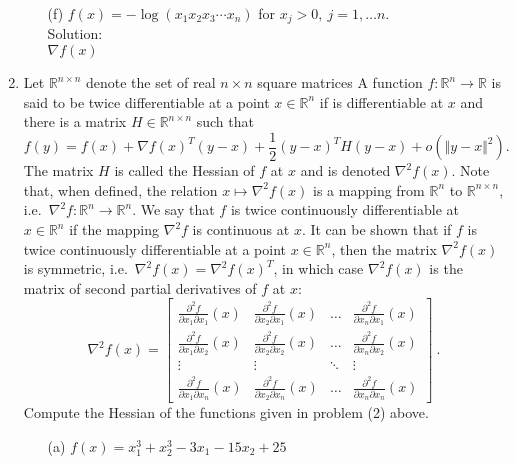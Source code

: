 \documentclass[12pt]{amsart}
\newcommand{\norm}[1]{\Vert #1 \Vert}
\newcommand{\Rn}{\R^n}
\newcommand{\R}{{\mathbb{R}}}
\newcommand{\grad}{\nabla}
\newcommand{\Rnn}{\R^{n\times n}}
\newcommand{\map}[3]{#1:#2\rightarrow #3}
\newcommand{\half}{\frac{1}{2}}
\begin{document}
\begin{enumerate}
\begin{enumerate}
\item[(f)] $f(x)=-\log(x_1x_2x_3\cdots x_n)$ for $x_j>0,\ j=1,\dots n$.\\

\noindent
Solution:\\
$\grad f(x) $\\

\end{enumerate}




\item
Let $\Rnn$ denote the set of real $n\times n$ square matrices
A function $\map{f}{\Rn}{\R}$ is said to be twice differentiable at a point $x\in\Rn$
if is differentiable at $x$ and there is a matrix $H\in\Rnn$ such that
$$f(y)=f(x)+\grad f(x)^T(y-x)+\half (y-x)^TH(y-x)+ o(\norm{y-x}^2).$$
The matrix $H$ is called the Hessian of $f$ at $x$ and is denoted $\grad^2f(x)$.
Note that, when defined, the relation $x\mapsto \grad^2 f(x)$ is
a mapping from $\Rn$ to $\Rnn$, i.e.~$\map{\grad^2 f}{\Rn}{\Rn}$.
We say that $f$ is twice continuously differentiable at $x\in\Rn$ if the mapping
$\grad^2 f$ is continuous at $x$. It can be shown that if $f$ is twice
continuously differentiable at a point $x\in\Rn$, then the matrix
$\grad^2f(x)$ is symmetric, i.e.~$\grad^2f(x)=\grad^2f(x)^T$, in which case
$\grad^2 f(x)$ is the matrix of second partial derivatives of $f$ at $x$:
$$
\grad^2f(x)=\left[\begin{array}{cccc}
\frac{\partial^2 f}{\partial x_1\partial x_1}(x)&
\frac{\partial^2 f}{\partial x_2\partial x_1}(x)&\dots&
\frac{\partial^2 f}{\partial x_n\partial x_1}(x)\\
\frac{\partial^2 f}{\partial x_1\partial x_2}(x)&
\frac{\partial^2 f}{\partial x_2\partial x_2}(x)&\dots&
\frac{\partial^2 f}{\partial x_n\partial x_2}(x)\\
\vdots&\vdots&\ddots&\vdots\\
\frac{\partial^2 f}{\partial x_1\partial x_n}(x)&
\frac{\partial^2 f}{\partial x_2\partial x_n}(x)&\dots&
\frac{\partial^2 f}{\partial x_n\partial x_n}(x)
\end{array}\right]\ .
$$
Compute the Hessian of the functions given in problem (2) above.

\begin{enumerate}
\item[(a)] $f(x)=x_1^3+x_2^3-3x_1-15x_2+25 $\\


\end{enumerate}
\end{enumerate}
\end{document}

